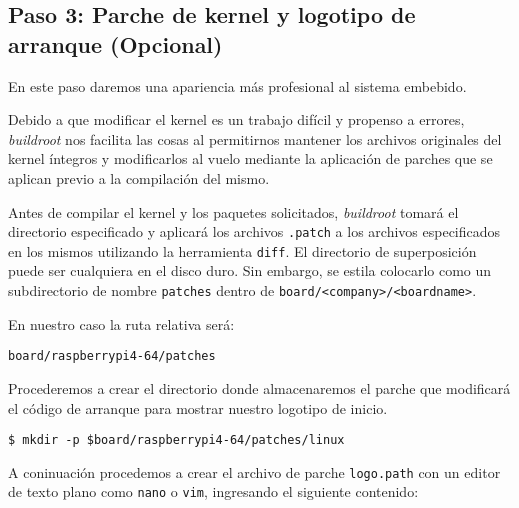 %
%



\subsection{Paso 3: Parche de kernel y logotipo de arranque (Opcional)}%
\label{sec:step3}
En este paso daremos una apariencia más profesional al sistema embebido.

Debido a que modificar el kernel es un trabajo difícil y propenso a errores, \emph{buildroot} nos facilita las cosas al permitirnos mantener los archivos originales del kernel íntegros y modificarlos al vuelo mediante la aplicación de parches que se aplican previo a la compilación del mismo.

Antes de compilar el kernel y los paquetes solicitados, \emph{buildroot} tomará el directorio especificado y aplicará los archivos \texttt{.patch} a los archivos especificados en los mismos utilizando la herramienta \texttt{diff}.
El directorio de superposición puede ser cualquiera en el disco duro.
Sin embargo, se estila colocarlo como un subdirectorio de nombre \texttt{patches} dentro de \texttt{board/<company>/<boardname>}.

\noindent
En nuestro caso la ruta relativa será:

\begin{Verbatim}[gobble=1]
	board/raspberrypi4-64/patches
\end{Verbatim}

Procederemos a crear el directorio donde almacenaremos el parche que modificará el código de arranque para mostrar nuestro logotipo de inicio.

\begin{Verbatim}[gobble=1]
	$ mkdir -p $board/raspberrypi4-64/patches/linux
\end{Verbatim}

\begin{samepage}
\noindent
A coninuación procedemos a crear el archivo de parche \texttt{logo.path} con un editor de texto plano como \texttt{nano} o \texttt{vim}, ingresando el siguiente contenido:

\noindent
\begin{minipage}{\columnwidth}

\end{minipage}
\end{samepage}


